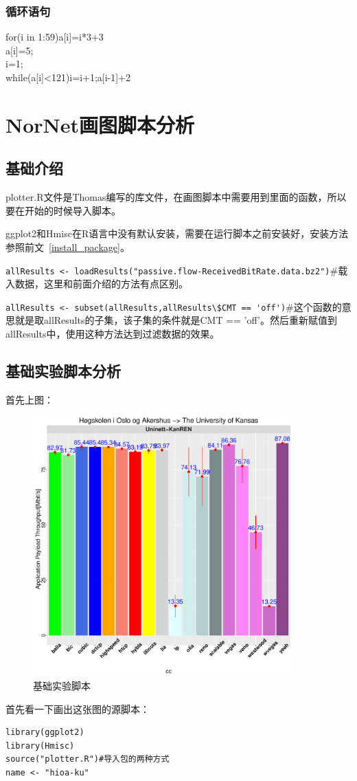 \documentclass[a4paper,12pt]{ctexbook}
\begin{document}
\begin{flushleft}
\subsection{循环语句}
for(i in 1:59){a[i]=i*3+3}\\

a[i]=5;\\
i=1;\\
while(a[i]<121){i=i+1;a[i-1]+2}


\chapter{NorNet画图脚本分析}
\section{基础介绍}
plotter.R文件是Thomas编写的库文件，在画图脚本中需要用到里面的函数，所以要在开始的时候导入脚本。

ggplot2和Hmisc在R语言中没有默认安装，需要在运行脚本之前安装好，安装方法参照前文~\ref{install_package}。

\verb|allResults <- loadResults("passive.flow-ReceivedBitRate.data.bz2")|\#载入数据，这里和前面介绍的方法有点区别。

\verb|allResults <- subset(allResults,allResults\$CMT == 'off')|\#这个函数的意思就是取allResults的子集，该子集的条件就是CMT == 'off'。然后重新赋值到allResults中，使用这种方法达到过滤数据的效果。

\section{基础实验脚本分析}
首先上图：
\begin{figure}[H]
	\begin{center}
	\includegraphics[width=10cm]{NorNet示例/demo-hioa-ku/hioa-ku-IPv6.pdf}
	\caption{基础实验脚本}
	\end{center}
\end{figure}
首先看一下画出这张图的源脚本：
\begin{verbatim}
library(ggplot2)
library(Hmisc)
source("plotter.R")#导入包的两种方式
name <- "hioa-ku"


\end{verbatim}
\end{flushleft}
\end{document}
